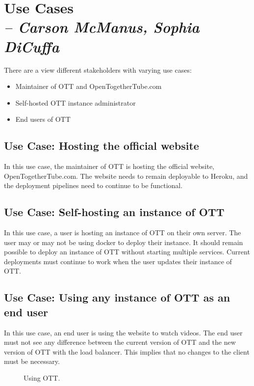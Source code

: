 \chapter{Use Cases \\
  \small{\textit{-- Carson McManus, Sophia DiCuffa}}
  \label{Chapter::UseCases}}

There are a view different stakeholders with varying use cases:

\begin{itemize}
	\item Maintainer of OTT and OpenTogetherTube.com
	\item Self-hosted OTT instance administrator
	\item End users of OTT
\end{itemize}

\section{Use Case: Hosting the official website}

In this use case, the maintainer of OTT is hosting the official website, OpenTogetherTube.com. The website needs to remain deployable to Heroku, and the deployment pipelines need to continue to be functional.

\section{Use Case: Self-hosting an instance of OTT}

In this use case, a user is hosting an instance of OTT on their own server. The user may or may not be using docker to deploy their instance. It should remain possible to deploy an instance of OTT without starting multiple services. Current deployments must continue to work when the user updates their instance of OTT.

\section{Use Case: Using any instance of OTT as an end user}

In this use case, an end user is using the website to watch videos. The end user must not see any difference between the current version of OTT and the new version of OTT with the load balancer. This implies that no changes to the client must be necessary.

\begin{figure}[!htb]
  \centering
  \caption{\label{Figure::enduser-usecase} Using OTT.}
\end{figure}